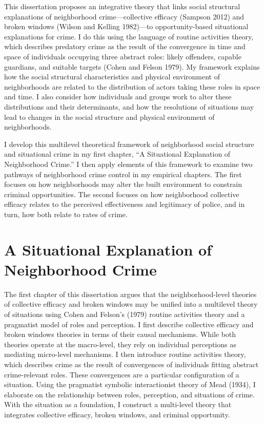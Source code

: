 \documentclass [11pt, proquest] {uwthesis}[2015/03/03]
\begin{document}
This dissertation proposes an integrative theory that links social structural explanations of neighborhood crime---collective efficacy (Sampson 2012) and broken windows (Wilson and Kelling 1982)---to opportunity-based situational explanations for crime. I do this using the language of routine activities theory, which describes predatory crime as the result of the convergence in time and space of individuals occupying three abstract roles: likely offenders, capable guardians, and suitable targets (Cohen and Felson 1979). My framework explains how the social structural characteristics and physical environment of neighborhoods are related to the distribution of actors taking these roles in space and time. I also consider how individuals and groups work to alter these distributions and their determinants, and how the resolutions of situations may lead to changes in the social structure and physical environment of neighborhoods.

I develop this multilevel theoretical framework of neighborhood social structure and situational crime in my first chapter, ``A Situational Explanation of Neighborhood Crime.'' I then apply elements of this framework to examine two pathways of neighborhood crime control in my empirical chapters. The first focuses on how neighborhoods may alter the built environment to constrain criminal opportunities. The second focuses on how neighborhood collective efficacy relates to the perceived effectiveness and legitimacy of police, and in turn, how both relate to rates of crime.

\hypertarget{a-situational-explanation-of-neighborhood-crime}{%
\section{A Situational Explanation of Neighborhood Crime}\label{a-situational-explanation-of-neighborhood-crime}}

The first chapter of this dissertation argues that the neighborhood-level theories of collective efficacy and broken windows may be unified into a multilevel theory of situations using Cohen and Felson's (1979) routine activities theory and a pragmatist model of roles and perception. I first describe collective efficacy and broken windows theories in terms of their causal mechanisms. While both theories operate at the macro-level, they rely on individual perceptions as mediating micro-level mechanisms. I then introduce routine activities theory, which describes crime as the result of convergences of individuals fitting abstract crime-relevant roles. These convergences are a particular configuration of a situation. Using the pragmatist symbolic interactionist theory of Mead (1934), I elaborate on the relationship between roles, perception, and situations of crime. With the situation as a foundation, I construct a multi-level theory that integrates collective efficacy, broken windows, and criminal opportunity.
\end{document}
